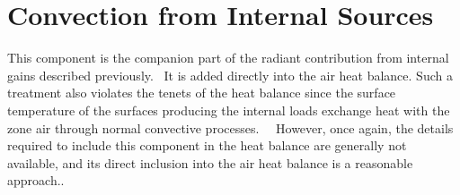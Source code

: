 \section{Convection from Internal Sources}\label{convection-from-internal-sources}

This component is the companion part of the radiant contribution from internal gains described previously.~ It is added directly into the air heat balance. Such a treatment also violates the tenets of the heat balance since the surface temperature of the surfaces producing the internal loads exchange heat with the zone air through normal convective processes.~~ However, once again, the details required to include this component in the heat balance are generally not available, and its direct inclusion into the air heat balance is a reasonable approach..
